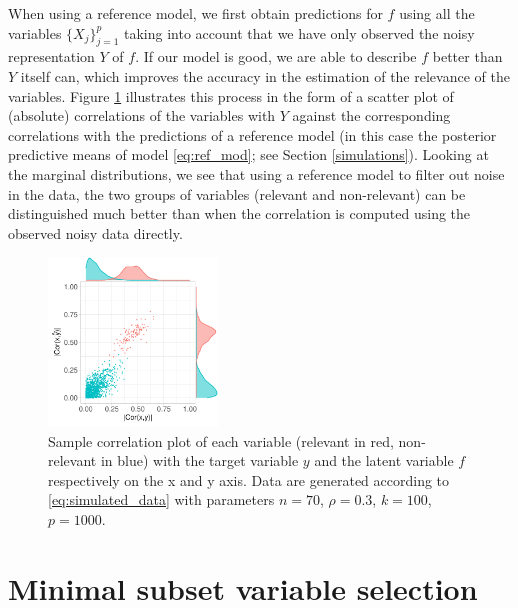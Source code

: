 \documentclass[a4]{article}
\theoremstyle{definition}
\begin{document}
When using a reference model, we first obtain predictions for $f$
using all the variables $\{X_{j}\}_{j=1}^{p}$ taking into account
that we have only observed the noisy representation $Y$ of $f$. If our
model is good, we are able to describe $f$ better than $Y$ itself can,
which improves the accuracy in the estimation of the relevance of the
variables.  Figure \ref{fig:correlation} illustrates this process in
the form of a scatter plot of (absolute) correlations of the
variables with $Y$ against the corresponding correlations with the
predictions of a reference model (in this case the posterior
predictive means of model \eqref{eq:ref_mod}; see Section
\ref{simulations}). Looking at the marginal distributions, we see
that using a reference model to filter out noise in the data, the two
groups of variables (relevant and non-relevant) can be distinguished
much better than when the correlation is computed using the observed
noisy data directly.

\begin{figure}[tp]
  \centering
  \vspace{-5mm}
  \includegraphics[width=0.4\textwidth]{graphics/correlation.pdf}
  \caption{Sample correlation plot of each variable (relevant in red, 
  non-relevant in blue) with the target variable $y$ and the latent variable 
  $f$ respectively on the x and y axis. Data are generated according to 
  \eqref{eq:simulated_data} with parameters $n=70$, $\rho=0.3$,
  $k=100$, $p=1000$.\\}
  \label{fig:correlation}
\end{figure}

\hypertarget{comparison-minimal-subset}{
\section{Minimal subset variable selection}\label{comparison-minimal-subset}}
\end{document}
